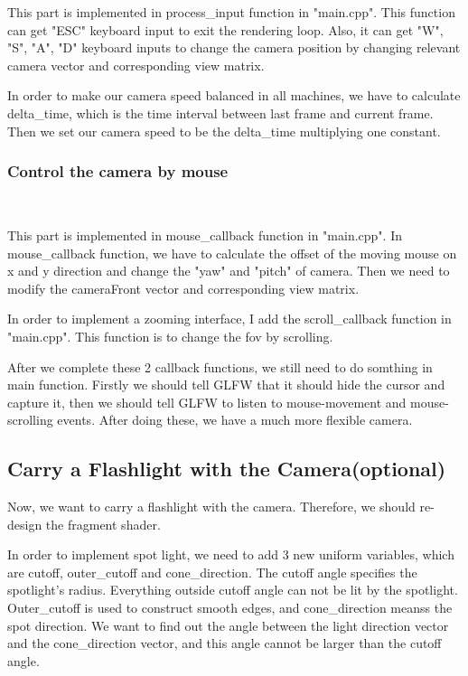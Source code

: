 \documentclass[acmtog]{acmart}
\begin{document}
This part is implemented in process\_input function in "main.cpp".
This function can get "ESC" keyboard input to exit the rendering loop.
Also, it can get "W", "S", "A", "D" keyboard inputs to change the camera position by changing relevant camera vector and corresponding view matrix. 

In order to make our camera speed balanced in all machines, we have to calculate delta\_time, which is the time interval between last frame and current frame.
Then we set our camera speed to be the delta\_time multiplying one constant.

\subsubsection{Control the camera by mouse}
~

This part is implemented in mouse\_callback function in "main.cpp".
In mouse\_callback function, we have to calculate the offset of the moving mouse on x and y direction and change the "yaw" and "pitch" of camera.
Then we need to modify the cameraFront vector and corresponding view matrix.

In order to implement a zooming interface, I add the scroll\_callback function in "main.cpp". This function is to change the fov by scrolling.

After we complete these 2 callback functions, we still need to do somthing in main function. 
Firstly we should tell GLFW that it should hide the cursor and capture it, then we should tell GLFW to listen to mouse-movement and mouse-scrolling events. 
After doing these, we have a much more flexible camera.

\subsection{Carry a Flashlight with the Camera(optional)}
\quad
Now, we want to carry a flashlight with the camera. Therefore, we should re-design the fragment shader.

In order to implement spot light, we need to add 3 new uniform variables, which are cutoff, outer\_cutoff and cone\_direction.
The cutoff angle specifies the spotlight's radius. Everything outside cutoff angle can not be lit by the spotlight.
Outer\_cutoff is used to construct smooth edges, and cone\_direction meanss the spot direction. 
We want to find out the angle between the light direction vector and the cone\_direction vector, and this angle cannot be larger than the cutoff angle. 
\end{document}
